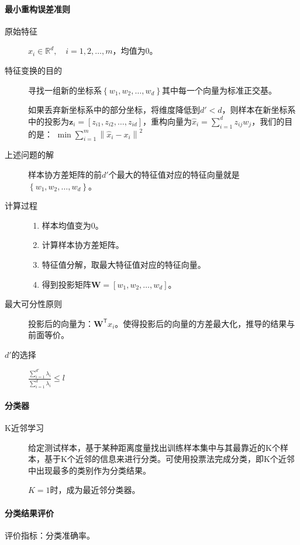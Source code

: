 \paragraph{最小重构误差准则}
\begin{description}
	\item[原始特征] $x_i\in \mathbb{R}^d,\quad i=1,2,\dots ,m$，均值为$0$。
	\item[特征变换的目的] 寻找一组新的坐标系$\left\lbrace w_1, w_2,\dots, w_d \right\rbrace$其中每一个向量为标准正交基。
	
	如果丢弃新坐标系中的部分坐标，将维度降低到$d'<d$，则样本在新坐标系中的投影为$\mathbf{z}_i=\left[ z_{i1}, z_{i2},\dots, z_{id} \right]$，重构向量为$\hat{x}_i=\sum_{i=1}^{d}z_{ij}w_j$，我们的目的是：
	$ \min\sum_{i=1}^{m}\left\| \hat{x}_i-x_i \right\|^2 $
	\item[上述问题的解] 样本协方差矩阵的前$d'$个最大的特征值对应的特征向量就是$\left\lbrace w_1, w_2,\dots,w_d \right\rbrace$。
	\item[计算过程]
	\begin{enumerate}
		\item 样本均值变为$0$。
		\item 计算样本协方差矩阵。
		\item 特征值分解，取最大特征值对应的特征向量。
		\item 得到投影矩阵$\mathbf{W}=\left[ w_1, w_2,\dots, w_d \right]$。
	\end{enumerate}
	\item[最大可分性原则] 投影后的向量为：$\mathbf{W}^\mathsf{T}x_i$。使得投影后的向量的方差最大化，推导的结果与前面等价。
	\item[$d'$的选择] $\frac{\sum_{i=1}^{d'}\lambda_i}{\sum_{i=1}^{d}\lambda_i}\leq l$
\end{description}
\paragraph{分类器}
\begin{description}
	\item[K近邻学习] 给定测试样本，基于某种距离度量找出训练样本集中与其最靠近的K个样本，基于K个近邻的信息来进行分类。可使用投票法完成分类，即K个近邻中出现最多的类别作为分类结果。
	 
	$K=1$时，成为最近邻分类器。
\end{description}
\paragraph{分类结果评价}
评价指标：分类准确率。
